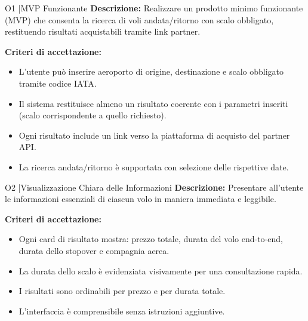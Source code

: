 \documentclass[a4paper, 11pt]{article}
\begin{document}
\begin{objectivebox}[colframe=black,colbacktitle=black]{O1 \quad|\quad MVP Funzionante}
\textbf{Descrizione:} Realizzare un prodotto minimo funzionante (MVP) che consenta la ricerca di voli andata/ritorno con scalo obbligato, restituendo risultati acquistabili tramite link partner.

\vspace{6pt}
\textbf{Criteri di accettazione:}
\begin{itemize}
  \item L'utente pu\`o inserire aeroporto di origine, destinazione e scalo obbligato tramite codice IATA.
  \item Il sistema restituisce almeno un risultato coerente con i parametri inseriti (scalo corrispondente a quello richiesto).
  \item Ogni risultato include un link verso la piattaforma di acquisto del partner API.
  \item La ricerca andata/ritorno \`e supportata con selezione delle rispettive date.
\end{itemize}
\end{objectivebox}

\vspace{8pt}

\begin{objectivebox}[colframe=black,colbacktitle=black]{O2 \quad|\quad Visualizzazione Chiara delle Informazioni}
\textbf{Descrizione:} Presentare all'utente le informazioni essenziali di ciascun volo in maniera immediata e leggibile.

\vspace{6pt}
\textbf{Criteri di accettazione:}
\begin{itemize}
  \item Ogni card di risultato mostra: prezzo totale, durata del volo end-to-end, durata dello stopover e compagnia aerea.
  \item La durata dello scalo \`e evidenziata visivamente per una consultazione rapida.
  \item I risultati sono ordinabili per prezzo e per durata totale.
  \item L'interfaccia \`e comprensibile senza istruzioni aggiuntive.
\end{itemize}
\end{objectivebox}

\vspace{8pt}
\end{document}
